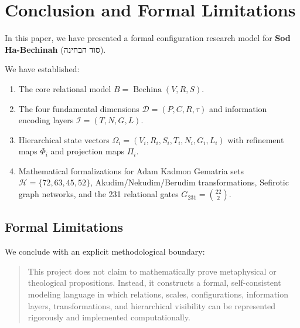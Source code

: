 \section{Conclusion and Formal Limitations}
\label{sec:conclusion}

In this paper, we have presented a formal configuration research model for \textbf{Sod Ha-Bechinah} (סוד הבחינה).

We have established:
\begin{enumerate}
    \item The core relational model $B = \operatorname{Bechina}(V, R, S)$.
    \item The four fundamental dimensions $\mathcal{D} = (P, C, R, \tau)$ and information encoding layers $\mathcal{I} = (T, N, G, L)$.
    \item Hierarchical state vectors $\Omega_i = (V_i, R_i, S_i, T_i, N_i, G_i, L_i)$ with refinement maps $\Phi_i$ and projection maps $\Pi_i$.
    \item Mathematical formalizations for Adam Kadmon Gematria sets $\mathcal{H} = \{72, 63, 45, 52\}$, Akudim/Nekudim/Berudim transformations, Sefirotic graph networks, and the 231 relational gates $G_{231} = \binom{22}{2}$.
\end{enumerate}

\subsection*{Formal Limitations}
We conclude with an explicit methodological boundary:
\begin{quote}
This project does not claim to mathematically prove metaphysical or theological propositions. Instead, it constructs a formal, self-consistent modeling language in which relations, scales, configurations, information layers, transformations, and hierarchical visibility can be represented rigorously and implemented computationally.
\end{quote}
